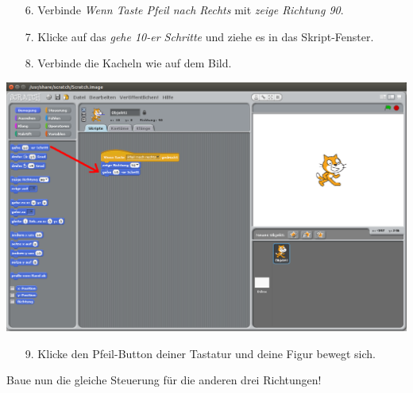 \begin{itemize}
\item[6.] Verbinde \textit{Wenn Taste Pfeil nach Rechts} mit \textit{zeige Richtung 90}.
\item[7.] Klicke auf das \textit{gehe 10-er Schritte} und ziehe es in das Skript-Fenster.
\item[8.] Verbinde die Kacheln wie auf dem Bild. 
\end{itemize}
\includegraphics[width=\textwidth]{images/aufgabe1_bewegung_verschieben2.png}

\begin{itemize}
\item[9.] Klicke den Pfeil-Button deiner Tastatur und deine Figur bewegt sich.
\end{itemize}

Baue nun die gleiche Steuerung für die anderen drei Richtungen!

